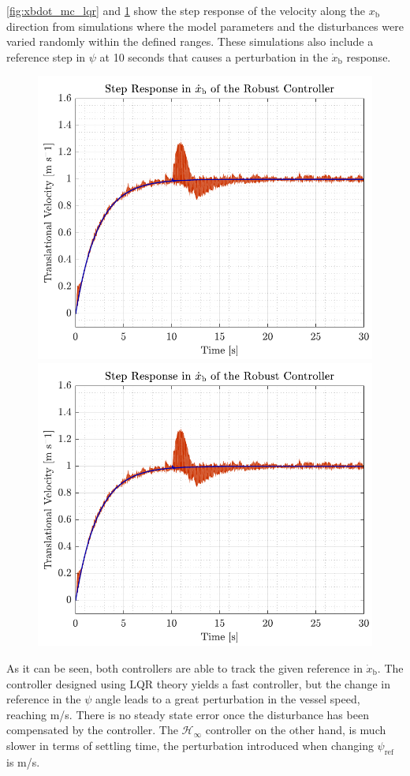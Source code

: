 \autoref{fig:xbdot_mc_lqr} and \ref{fig:xbdot_mc_rob} show the step response of the velocity along the $x_\mathrm{b}$ direction from  simulations where the model parameters and the disturbances were varied randomly within the defined ranges. These simulations also include a reference step in $\psi$ at 10 seconds that causes a perturbation in the $\dot{x}_\mathrm{b}$ response.
\begin{figure}[H]
    \captionbox 
    {   
        \label{fig:xbdot_mc_lqr}
    }                                                                 
    {                                                                  
        \includegraphics[width=.45\textwidth]{figures/xbdot_mc_lqr}         
    }                                                                    
    \hspace{5pt}                                                          
    \captionbox  
    {      
        \label{fig:xbdot_mc_rob}
    }                                                                          
    {
        \includegraphics[width=.45\textwidth]{figures/xbdot_mc_rob}
    }
\end{figure}
As it can be seen, both controllers are able to track the given reference in $\dot{x}_\mathrm{b}$. The controller designed using LQR theory yields a fast controller, but the change in reference in the $\psi$ angle leads to a great perturbation in the vessel speed, reaching  m/s. There is no steady state error once the disturbance has been compensated by the controller. The $\mathcal{H}_\infty$ controller on the other hand, is much slower in terms of settling time, the perturbation introduced when changing $\psi_\mathrm{ref}$ is  m/s. 

